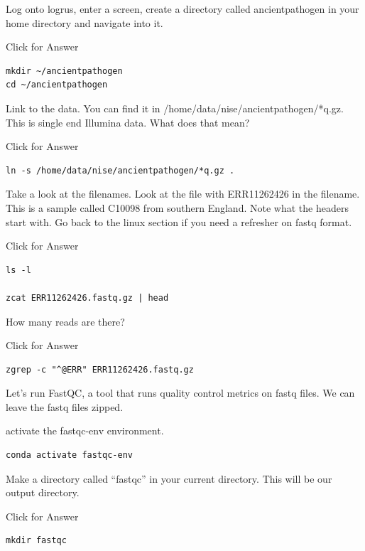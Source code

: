 \documentclass[
]{book}
\begin{document}
Log onto logrus, enter a screen, create a directory called ancientpathogen in your home directory and navigate into it.

Click for Answer

\begin{verbatim}
mkdir ~/ancientpathogen
cd ~/ancientpathogen
\end{verbatim}

\hfill\break

Link to the data. You can find it in /home/data/nise/ancientpathogen/*q.gz. This is single end Illumina data. What does that mean?

Click for Answer

\begin{verbatim}
ln -s /home/data/nise/ancientpathogen/*q.gz .
\end{verbatim}

\hfill\break

Take a look at the filenames. Look at the file with ERR11262426 in the filename. This is a sample called C10098 from southern England. Note what the headers start with. Go back to the linux section if you need a refresher on fastq format.

Click for Answer

\begin{verbatim}
ls -l

zcat ERR11262426.fastq.gz | head
\end{verbatim}

\hfill\break

How many reads are there?

Click for Answer

\begin{verbatim}
zgrep -c "^@ERR" ERR11262426.fastq.gz
\end{verbatim}

\hfill\break

Let's run FastQC, a tool that runs quality control metrics on fastq files. We can leave the fastq files zipped.

activate the fastqc-env environment.

\begin{verbatim}
conda activate fastqc-env
\end{verbatim}

Make a directory called ``fastqc'' in your current directory. This will be our output directory.

Click for Answer

\begin{verbatim}
mkdir fastqc
\end{verbatim}
\end{document}
